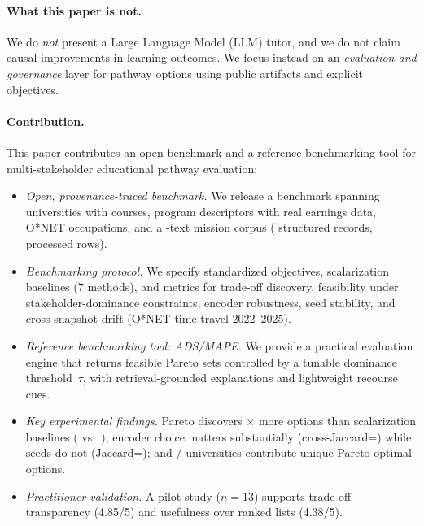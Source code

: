 \documentclass[sigconf,review]{acmart}
\newcommand{\ADS}{\textsc{ADS}\xspace}
\newcommand{\MAPE}{\textsc{MAPE}\xspace}
\begin{document}
\paragraph{What this paper is not.}
We do \emph{not} present a Large Language Model (LLM) tutor, and we do not claim causal improvements in learning outcomes. We focus instead on an \emph{evaluation and governance} layer for pathway options using public artifacts and explicit objectives.

\paragraph{Contribution.} This paper contributes an open benchmark and a reference benchmarking tool for multi-stakeholder educational pathway evaluation:
\begin{itemize}
  \item \textit{Open, provenance-traced benchmark.} We release a benchmark spanning {\NumUniversities} universities with \NumCourses{} courses, \NumPrograms{} program descriptors with real earnings data, \NumOccupations{} O*NET occupations, and a \NumMissionsExpanded-text mission corpus (\NumAttributeRecords{} structured records, \NumProcessedRows{} processed rows).
  \item \textit{Benchmarking protocol.} We specify standardized objectives, scalarization baselines (7 methods), and metrics for trade-off discovery, feasibility under stakeholder-dominance constraints, encoder robustness, seed stability, and cross-snapshot drift (O*NET time travel 2022--2025).
  \item \textit{Reference benchmarking tool: \ADS/\MAPE.} We provide a practical evaluation engine that returns feasible Pareto sets controlled by a tunable dominance threshold~$\tau$, with retrieval-grounded explanations and lightweight recourse cues.
  \item \textit{Key experimental findings.} Pareto discovers {\ParetoVsBaselineRatio}$\times$ more options than scalarization baselines ({\MainParetoSize} vs.\ {\BaselineOptima}); encoder choice matters substantially (cross-Jaccard={\CrossEncoderJaccard}) while seeds do not (Jaccard={\SeedStabilityJaccard}); and {\NumUnisContributing}/{\NumUniversities} universities contribute unique Pareto-optimal options.
  \item \textit{Practitioner validation.} A pilot study ($n{=}13$) supports trade-off transparency (4.85/5) and usefulness over ranked lists (4.38/5).
\end{itemize}
\end{document}
